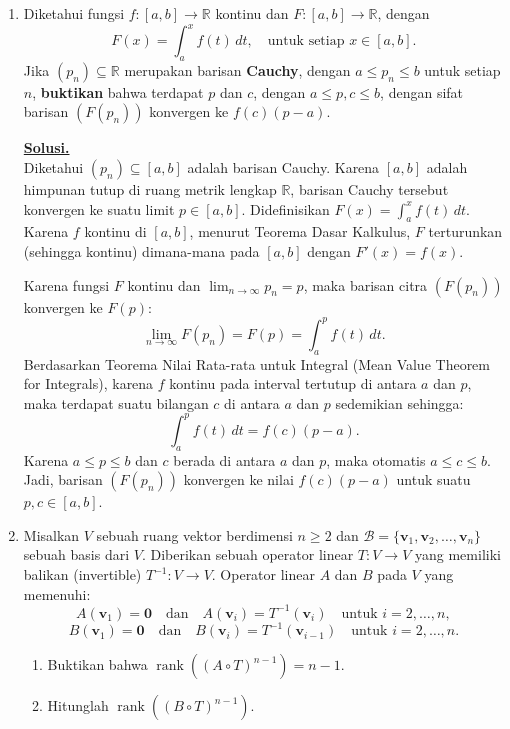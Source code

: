 \documentclass[12pt,twoside]{article}
\newenvironment{solution}
{
	\par\noindent\textbf{\underline{Solusi.}}\\
}
{
	\par
}
\begin{document}
\begin{enumerate}
  \item Diketahui fungsi $f : [a, b] \to \mathbb{R}$ kontinu dan $F : [a, b] \to \mathbb{R}$, dengan
        \[
          F(x) = \int_a^x f(t) \, dt, \quad \text{untuk setiap } x \in [a, b].
        \]
        Jika $(p_n) \subseteq \mathbb{R}$ merupakan barisan \textbf{Cauchy}, dengan $a \leq p_n \leq b$ untuk setiap $n$, \textbf{buktikan} bahwa terdapat $p$ dan $c$, dengan $a \leq p, c \leq b$, dengan sifat barisan $(F(p_n))$ konvergen ke $f(c)(p - a)$.

        \begin{solution}
          Diketahui $(p_n) \subseteq [a, b]$ adalah barisan Cauchy. Karena $[a, b]$ adalah himpunan tutup di ruang metrik lengkap $\mathbb{R}$, barisan Cauchy tersebut konvergen ke suatu limit $p \in [a, b]$.
          Didefinisikan $F(x) = \int_a^x f(t) \, dt$. Karena $f$ kontinu di $[a, b]$, menurut Teorema Dasar Kalkulus, $F$ terturunkan (sehingga kontinu) dimana-mana pada $[a, b]$ dengan $F'(x) = f(x)$.

          Karena fungsi $F$ kontinu dan $\lim_{n \to \infty} p_n = p$, maka barisan citra $(F(p_n))$ konvergen ke $F(p)$:
          \[ \lim_{n \to \infty} F(p_n) = F(p) = \int_a^p f(t) \, dt. \]
          Berdasarkan Teorema Nilai Rata-rata untuk Integral (Mean Value Theorem for Integrals), karena $f$ kontinu pada interval tertutup di antara $a$ dan $p$, maka terdapat suatu bilangan $c$ di antara $a$ dan $p$ sedemikian sehingga:
          \[ \int_a^p f(t) \, dt = f(c)(p - a). \]
          Karena $a \le p \le b$ dan $c$ berada di antara $a$ dan $p$, maka otomatis $a \le c \le b$.
          Jadi, barisan $(F(p_n))$ konvergen ke nilai $f(c)(p - a)$ untuk suatu $p, c \in [a, b]$.
        \end{solution}

  \item Misalkan $V$ sebuah ruang vektor berdimensi $n \geq 2$ dan $\mathcal{B} = \{\mathbf{v}_1, \mathbf{v}_2, \ldots, \mathbf{v}_n\}$ sebuah basis dari $V$. Diberikan sebuah operator linear $T : V \to V$ yang memiliki balikan (invertible) $T^{-1} : V \to V$. Operator linear $A$ dan $B$ pada $V$ yang memenuhi:
        \[
          A(\mathbf{v}_1) = \mathbf{0} \quad \text{dan} \quad A(\mathbf{v}_i) = T^{-1}(\mathbf{v}_{i}) \quad \text{untuk } i = 2, \dots, n,
        \]
        \[
          B(\mathbf{v}_1) = \mathbf{0} \quad \text{dan} \quad B(\mathbf{v}_i) = T^{-1}(\mathbf{v}_{i-1}) \quad \text{untuk } i = 2, \dots, n.
        \]
        \begin{enumerate}
          \item Buktikan bahwa $\operatorname{rank}((A \circ T)^{n - 1}) = n - 1$.
          \item Hitunglah $\operatorname{rank}((B \circ T)^{n - 1})$.
        \end{enumerate}


\end{enumerate}
\end{document}
